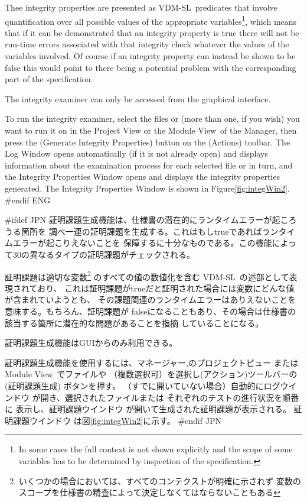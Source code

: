 \documentclass[\pformat,12pt]{article}
\newcommand{\vdmslpp}{VDM-SL}
\newcommand{\vdmModView}{\guicmd{Module View}}
\newcommand{\vdmModView}{\guicmd{モジュールビュー}}
\newcommand{\vdmslpp}{VDM++}
\newcommand{\vdmModView}{\guicmd{VDM View}}
\newcommand{\vdmModView}{\guicmd{VDMビュー}}
\newcommand{\guicmd}[1]{{\sf #1}}
\newcommand{\guicmd}[1]{{\gt #1}}
\begin{document}
Thee integrity properties are presented as \vdmslpp\ predicates that 
involve quantification over all possible values of the appropriate
variables\footnote{In some cases the full context is not shown
  explicitly and the scope of some variables has to be determined by
  inspection of the specification.}, which means that if it can be
demonstrated that an integrity property is true there will not be
run-time errors associated with that integrity check whatever the
values of the variables involved. Of course if an integrity property
can instead be shown to be false this would point to there being a
potential problem with the corresponding part of the specification.

The integrity examiner can only be accessed from the graphical
interface. 

To run the integrity examiner, select the files or
 (more than one, if you
wish) you want to run it on in the \guicmd{Project View} or the
\vdmModView\ of the \guicmd{Manager}, then press the
(\guicmd{Generate Integrity Properties}) button on the (\guicmd{Actions})
toolbar. The \guicmd{Log Window} opens automatically (if it is not
already open) and displays information about the examination process
for each selected file or 
in turn, and the \guicmd{Integrity Properties Window} opens and
displays the integrity properties generated. The \guicmd{Integrity
  Properties Window} is shown in Figure\ref{fig:integWin2}.
#endif ENG

#ifdef JPN
証明課題生成機能は、仕様書の潜在的にランタイムエラーが起ころうる箇所を
調べ一連の証明課題を生成する。これはもしtrueであればランタイムエラーが起こりえないことを
保障するに十分なものである。この機能によって30の異なるタイプの証明課題がチェックされる。

証明課題は適切な変数\footnote{いくつかの場合においては、すべてのコンテクストが明確に示されず
  変数のスコープを仕様書の精査によって決定しなくてはならないこともある} のすべての値の数値化を含む
\vdmslpp\ の述部として表現されており、
これは証明課題がtrueだと証明された場合には変数にどんな値が含まれていようとも、
その課題関連のランタイムエラーはありえないことを意味する。もちろん、証明課題が
falseになることもあり、その場合は仕様書の該当する箇所に潜在的な問題があることを指摘
していることになる。

証明課題生成機能はGUIからのみ利用できる。

証明課題生成機能を使用するには、\guicmd{マネージャー},の\guicmd{プロジェクトビュー} または
\vdmModView\ でファイルや
 （複数選択可）を選択し(\guicmd{アクション})ツールバーの 
(\guicmd{証明課題生成}) ボタンを押す。 （すでに開いていない場合）自動的に\guicmd{ログウインドウ} 
が開き、選択されたファイルまたは
 それぞれのテストの進行状況を順番に
表示し、\guicmd{証明課題ウインドウ} が開いて生成された証明課題が表示される。
\guicmd{証明課題ウインドウ} は図\ref{fig:integWin2}に示す。
#endif JPN
\end{document}
